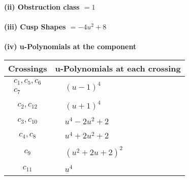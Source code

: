 \documentclass[1p]{elsarticle_modified}
\theoremstyle{definition}
\begin{document}
\flushleft \textbf{(ii) Obstruction class $= 1$}\\~\\
\flushleft \textbf{(iii) Cusp Shapes $= -4 u^2+8$}\\~\\
\newpage\renewcommand{\arraystretch}{1}
\flushleft \textbf{(iv) u-Polynomials at the component}\newline \\
\begin{tabular}{m{50pt}|m{274pt}}
Crossings & \hspace{64pt}u-Polynomials at each crossing \\
\hline $$\begin{aligned}c_{1},c_{5},c_{6}\\c_{7}\end{aligned}$$&$\begin{aligned}
&(u-1)^4
\end{aligned}$\\
\hline $$\begin{aligned}c_{2},c_{12}\end{aligned}$$&$\begin{aligned}
&(u+1)^4
\end{aligned}$\\
\hline $$\begin{aligned}c_{3},c_{10}\end{aligned}$$&$\begin{aligned}
&u^4-2 u^2+2
\end{aligned}$\\
\hline $$\begin{aligned}c_{4},c_{8}\end{aligned}$$&$\begin{aligned}
&u^4+2 u^2+2
\end{aligned}$\\
\hline $$\begin{aligned}c_{9}\end{aligned}$$&$\begin{aligned}
&(u^2+2 u+2)^2
\end{aligned}$\\
\hline $$\begin{aligned}c_{11}\end{aligned}$$&$\begin{aligned}
&u^4
\end{aligned}$\\
\hline
\end{tabular}\\~\\
\end{document}
